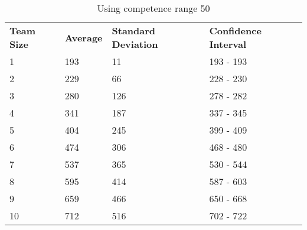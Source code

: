 \documentclass[12pt]{article}
\begin{document}
\begin{table}[!htb]
	\centering
	\caption{Using competence range 50}
	\begin{tabular}{llll}
		\textbf{Team Size} & \textbf{Average} & \textbf{Standard Deviation} & \textbf{Confidence Interval} \\
		1                  & 193              & 11                          & 193 - 193                    \\
		2                  & 229              & 66                          & 228 - 230                    \\
		3                  & 280              & 126                         & 278 - 282                    \\
		4                  & 341              & 187                         & 337 - 345                    \\
		5                  & 404              & 245                         & 399 - 409                    \\
		6                  & 474              & 306                         & 468 - 480                    \\
		7                  & 537              & 365                         & 530 - 544                    \\
		8                  & 595              & 414                         & 587 - 603                    \\
		9                  & 659              & 466                         & 650 - 668                    \\
		10                 & 712              & 516                         & 702 - 722                   
	\end{tabular}
\end{table}
\end{document}
